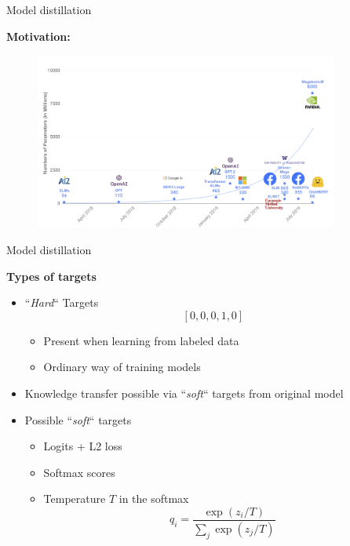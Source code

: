 
\begin{frame}{Model distillation}

\textbf{Motivation:}
	\begin{figure}
		\centering
		\includegraphics[width = 10cm]{figure/53-distilbert-motivation}\\ 
	\end{figure}
	
\end{frame}


\begin{frame}{Model distillation}

\vfill

\textbf{Types of targets} 

\begin{itemize}
	\item ``\textit{Hard}`` Targets $$[0, 0, 0, 1, 0]$$ \vspace{-.5cm}
		\begin{itemize}
			\item Present when learning from labeled data
			\item Ordinary way of training models
		\end{itemize}
	\item Knowledge transfer possible via ``\textit{soft}`` targets from original model
	\item Possible ``\textit{soft}`` targets
		\begin{itemize}
			\item Logits + L2 loss 
			\item Softmax scores
			\item Temperature $T$ in the softmax 
						$$q_i = \frac{\exp(z_i/T)}{\sum_j \exp(z_j/T)}$$
		\end{itemize}
\end{itemize}

\vfill

\end{frame}


